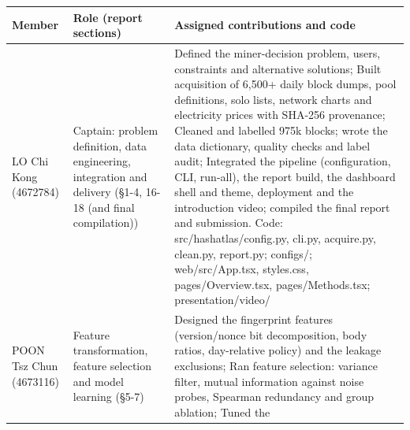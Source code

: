 \documentclass[
  11pt,
  a4paper,
]{article}
\newenvironment{reporttable}{\par\small\sffamily}{\par}
\newcommand{\code}[1]{{\ttfamily\color{ReportInkTwo}#1}}
\begin{document}
\begin{reporttable}

\begin{longtable}[]{@{}
  >{\raggedright\arraybackslash}p{}
  >{\raggedright\arraybackslash}p{}
  >{\raggedright\arraybackslash}p{}@{}}
\toprule\noalign{}
\begin{minipage}[b]{\linewidth}\raggedright
\textbf{Member}
\end{minipage} & \begin{minipage}[b]{\linewidth}\raggedright
\textbf{Role (report sections)}
\end{minipage} & \begin{minipage}[b]{\linewidth}\raggedright
\textbf{Assigned contributions and code}
\end{minipage} \\
\midrule\noalign{}
\endhead
\bottomrule\noalign{}
\endlastfoot
LO Chi Kong (4672784) & Captain: problem definition, data engineering,
integration and delivery (§1-4, 16-18 (and final compilation)) & Defined
the miner-decision problem, users, constraints and alternative
solutions; Built acquisition of 6,500+ daily block dumps, pool
definitions, solo lists, network charts and electricity prices with
SHA-256 provenance; Cleaned and labelled 975k blocks; wrote the data
dictionary, quality checks and label audit; Integrated the pipeline
(configuration, CLI, run-all), the report build, the dashboard shell and
theme, deployment and the introduction video; compiled the final report
and submission. Code:
\code{src/\allowbreak{}hashatlas/\allowbreak{}config.\allowbreak{}py,\allowbreak{} cli.\allowbreak{}py,\allowbreak{} acquire.\allowbreak{}py,\allowbreak{} clean.\allowbreak{}py,\allowbreak{} report.\allowbreak{}py; configs/\allowbreak{}; web/\allowbreak{}src/\allowbreak{}App.\allowbreak{}tsx,\allowbreak{} styles.\allowbreak{}css,\allowbreak{} pages/\allowbreak{}Overview.\allowbreak{}tsx,\allowbreak{} pages/\allowbreak{}Methods.\allowbreak{}tsx; presentation/\allowbreak{}video/\allowbreak{}} \\
POON Tsz Chun (4673116) & Feature transformation, feature selection and
model learning (§5-7) & Designed the fingerprint features (version/nonce
bit decomposition, body ratios, day-relative policy) and the leakage
exclusions; Ran feature selection: variance filter, mutual information
against noise probes, Spearman redundancy and group ablation; Tuned the

\end{longtable}
\end{reporttable}
\end{document}
